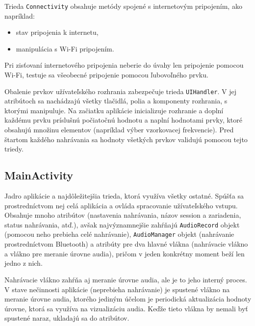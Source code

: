 \label{connectivity}
Trieda \texttt{Connectivity} obsahuje metódy spojené s internetovým pripojením, ako napríklad:
\begin{itemize}
 \item{stav pripojenia k internetu,}
 \item{manipulácia s Wi-Fi pripojením.}
\end{itemize}
Pri zisťovaní internetového pripojenia neberie do úvahy len pripojenie pomocou Wi-Fi, testuje sa všeobecné pripojenie pomocou ľubovoľného prvku.

Obalenie prvkov užívateľského rozhrania zabezpečuje trieda \texttt{UIHandler}. V jej atribútoch sa nachádzajú všetky tlačidlá, polia a komponenty rozhrania, s ktorými manipuluje. Na začiatku aplikácie inicializuje rozhranie a doplní každému prvku príslušnú počiatočnú hodnotu a naplní hodnotami prvky, ktoré obsahujú množinu elementov (napríklad výber vzorkovacej frekvencie). Pred štartom každého nahrávania sa hodnoty všetkých prvkov validujú pomocou tejto triedy. 

\subsection*{MainActivity}

Jadro aplikácie a najdôležitejšia trieda, ktorá využíva všetky ostatné. Spúšťa sa prostredníctvom nej celá aplikácia a ovláda spracovanie užívateľského vstupu. Obsahuje mnoho atribútov (nastavenia nahrávania, názov session a zariadenia, status nahrávania, atď.), avšak najvýznamnejšie zahŕňajú \texttt{AudioRecord} objekt (pomocou neho prebieha celé nahrávanie), \texttt{AudioManager} objekt (nahrávanie prostredníctvom Bluetooth) a atribúty pre dva hlavné vlákna (nahrávacie vlákno a vlákno pre meranie úrovne audia), pričom v jeden konkrétny moment beží len jedno z nich.

Nahrávacie vlákno zahŕňa aj meranie úrovne audia, ale je to jeho interný proces. V stave nečinnosti aplikácie (neprebieha nahrávanie) je spustené vlákno na meranie úrovne audia, ktorého jediným účelom je periodická aktualizácia hodnoty úrovne, ktorá sa využíva na vizualizáciu audia. Keďže tieto vlákna by nemali byť spustené naraz, ukladajú sa do atribútov.

